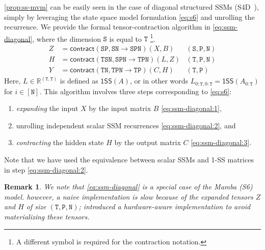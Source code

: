 \documentclass{article}
\newcommand{\citep}{\parencite}
\newcommand{\citet}{\textcite}
\newtheorem{remark}{Remark}
\newcommand{\R}{\mathbb{R}}
\begin{document}
\cref{prop:ss-mvm} can be easily seen in the case of diagonal structured SSMs (S4D~\citep{gu2022parameterization}),
simply by leveraging the state space model formulation \eqref{eq:s6} and unrolling the recurrence.
We provide the formal tensor-contraction algorithm in \eqref{eq:ssm-diagonal}, where the dimension $\mathtt{S}$ is equal to $\mathtt{T}$
\footnote{A different symbol is required for the contraction notation.}.
\begin{subequations}
  \label{eq:ssm-diagonal}
  \begin{align}
    \label{eq:ssm-diagonal:1}
    Z &= \mathsf{contract}(\mathtt{SP},\mathtt{SN} \to \mathtt{SPN})(X, B) & \mathtt{(S,P,N)} \\
    \label{eq:ssm-diagonal:2}
    H &= \mathsf{contract}(\mathtt{TSN},\mathtt{SPN} \to \mathtt{TPN})(L, Z) & \mathtt{(T,P,N)} \\
    \label{eq:ssm-diagonal:3}
    Y &= \mathsf{contract}(\mathtt{TN},\mathtt{TPN} \to \mathtt{TP})(C, H) & \mathtt{(T,P)}
  \end{align}
\end{subequations}
Here, $L \in \R^{(\mathtt{T},\mathtt{T})}$ is defined as $\mathsf{1SS}(A)$, or in other words $L_{0:\mathtt{T},0:\mathtt{T}} = \mathsf{1SS}(A_{0:\mathtt{T}})$ for $i \in [\mathtt{N}]$.
This algorithm involves three steps corresponding to \eqref{eq:s6}:
\begin{enumerate}[label=(\roman*)]
  \item \emph{expanding} the input $X$ by the input matrix $B$ \eqref{eq:ssm-diagonal:1},
  \item unrolling independent scalar SSM recurrences \eqref{eq:ssm-diagonal:2}, and
  \item \emph{contracting} the hidden state $H$ by the output matrix $C$ \eqref{eq:ssm-diagonal:3}.
\end{enumerate}
Note that we have used the equivalence between scalar SSMs and 1-SS matrices in step \eqref{eq:ssm-diagonal:2}.

\begin{remark}
  We note that \eqref{eq:ssm-diagonal} is a special case of the Mamba (S6) model.
  however, a naive implementation is slow because of the expanded tensors $Z$ and $H$ of size $\mathtt{(T,P,N)}$;
  \citet{gu2023mamba} introduced a hardware-aware implementation to avoid materializing these tensors.
\end{remark}
\end{document}
